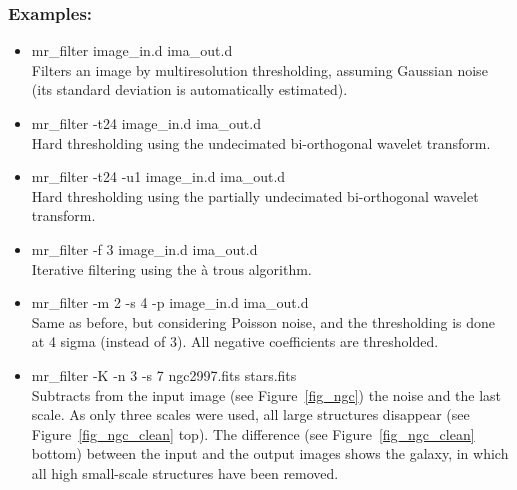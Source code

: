 \begin{itemize}
\subsubsection*{Examples:}
\begin{itemize}
\baselineskip=0.4truecm
\itemsep=0.1truecm
\item mr\_filter image\_in.d ima\_out.d \\
Filters an image by multiresolution  thresholding, assuming
Gaussian noise (its standard deviation is automatically estimated).
\item mr\_filter -t24 image\_in.d ima\_out.d \\
Hard thresholding using the undecimated bi-orthogonal wavelet transform.
\item mr\_filter -t24 -u1 image\_in.d ima\_out.d \\
Hard thresholding using the partially undecimated bi-orthogonal 
wavelet transform.
\item mr\_filter -f 3 image\_in.d ima\_out.d \\
Iterative filtering using the \`a trous algorithm.
\item mr\_filter -m 2 -s 4 -p image\_in.d ima\_out.d \\
Same as before, but considering Poisson noise, and the thresholding is done
 at 4 sigma (instead of 3). All negative coefficients are thresholded.
\item mr\_filter -K -n 3 -s 7 ngc2997.fits stars.fits \\
Subtracts from the input image (see Figure~\ref{fig_ngc}) 
the noise and the last scale. As only three
scales were used, all large structures disappear (see 
Figure~\ref{fig_ngc_clean} top). The difference (see 
Figure~\ref{fig_ngc_clean} bottom) between the 
input and the output images shows the galaxy, in which all high small-scale
structures have been removed. 
\end{itemize}


\end{itemize}
